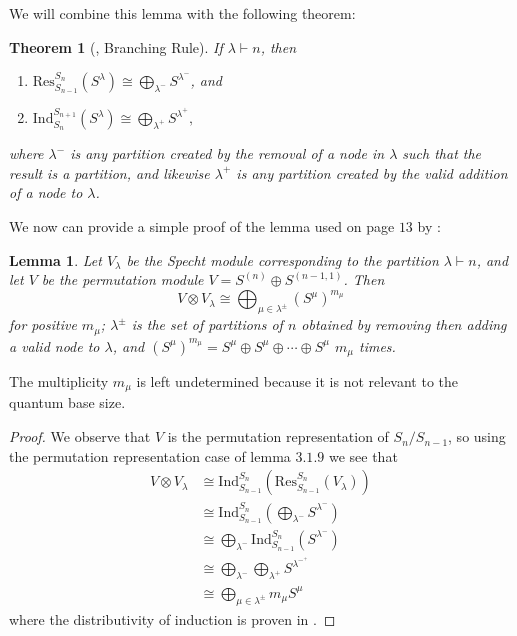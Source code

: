 \documentclass[12pt,twoside]{reedthesis}
\theoremstyle{plain}   %
\newtheorem{thm}{Theorem}[section] %
\newtheorem{lemma}{Lemma}[section]
\theoremstyle{definition}
\theoremstyle{remark}
\numberwithin{equation}{section}
\def\ind{\mathrm{Ind}}
\def\res{\mathrm{Res}}
\begin{document}
  We will combine this lemma with the following theorem:
  \begin{thm}[{\cite[2.8.3]{sagan}, Branching Rule}]
    If $\lambda \vdash n$, then
    \begin{enumerate}
    \item $\res^{S_{n}}_{S_{n-1}} (S^\lambda) \cong \bigoplus_{\lambda^-} S^{\lambda^-}$, and
    \item $\ind^{S_{n+1}}_{S_{n}} (S^\lambda) \cong \bigoplus_{\lambda^+} S^{\lambda^+},$
    \end{enumerate}
    where $\lambda^-$ is any partition created by the removal of a node in $\lambda$ such that the result is a partition,
    and likewise $\lambda^+$ is any partition created by the valid addition of a node to $\lambda$.
  \end{thm}
  We now can provide a simple proof of the lemma used on page $13$ by \cite{copeland}:
  \begin{lemma}
    Let $V_\lambda$ be the Specht module corresponding to the partition $\lambda \vdash n$, and let $V$ be the permutation module $V = S^{(n)} \oplus S^{(n-1,1)}$.
    Then
    \[V \otimes V_\lambda \cong \bigoplus_ {\mu \in \lambda^\pm} (S^\mu)^{m_\mu} \]
    for positive $m_\mu$; $\lambda^\pm$ is the set of partitions of $n$ obtained by removing then adding a valid node to $\lambda$,
    and $(S^\mu)^{m_\mu} = S^\mu \oplus S^\mu \oplus \cdots \oplus S^\mu $ $m_\mu$ times.
  \end{lemma}
  The multiplicity $m_\mu$ is left undetermined because it is not relevant to the quantum base size.
  \begin{proof}
    We observe that $V$ is the permutation representation of $S_n / S_{n-1}$, so using the permutation representation case of lemma $3.1.9$ we see that
    \begin{align*}
      V \otimes V_\lambda &\cong \ind^{S_{n}}_{S_{n-1}} ( \res^{S_{n}}_{S_{n-1}} (V_\lambda))\\
                          &\cong \ind^{S_{n}}_{S_{n-1}} (\bigoplus_{\lambda^-} S^{\lambda^-})\\
                          &\cong \bigoplus_{\lambda^-} \ind^{S_{n}}_{S_{n-1}} ( S^{\lambda^-}) \\
                          &\cong \bigoplus_{\lambda^-} \bigoplus_{\lambda^+} S^{\lambda^{-^+}} \\
                          &\cong \bigoplus_ {\mu \in \lambda^\pm} m_\mu S^\mu
    \end{align*}
    where the distributivity of induction is proven in \cite[Exercise 3.15]{fulton2004}.
  \end{proof}
\end{document}
